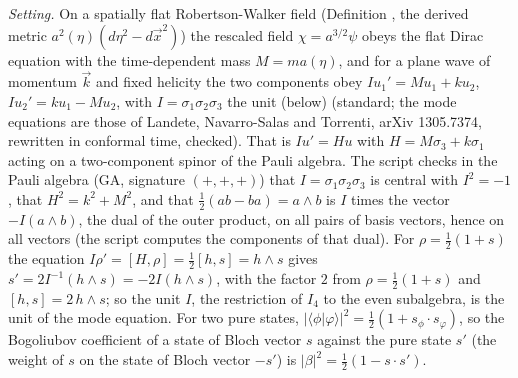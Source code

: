 \emph{Setting.} On a spatially flat Robertson-Walker field (Definition , the derived metric $a^{2}(\eta)(d\eta^{2} - d\vec x^{2})$) the rescaled field $\chi = a^{3/2}\psi$ obeys the flat Dirac equation with the time-dependent mass $M = ma(\eta)$, and for a plane wave of momentum $\vec k$ and fixed helicity the two components obey $Iu_{1}' = Mu_{1} + ku_{2}$, $Iu_{2}' = ku_{1} - Mu_{2}$, with $I = \sigma_{1}\sigma_{2}\sigma_{3}$ the unit (below) (standard; the mode equations are those of Landete, Navarro-Salas and Torrenti, arXiv 1305.7374, rewritten in conformal time, checked). That is $Iu' = Hu$ with $H = M\sigma_{3} + k\sigma_{1}$ acting on a two-component spinor of the Pauli algebra. The script checks in the Pauli algebra (GA, signature $(+,+,+)$) that $I = \sigma_{1}\sigma_{2}\sigma_{3}$ is central with $I^{2} = -1$, that $H^{2} = k^{2} + M^{2}$, and that $\tfrac12(ab - ba) = a\wedge b$ is $I$ times the vector $-I(a\wedge b)$, the dual of the outer product, on all pairs of basis vectors, hence on all vectors (the script computes the components of that dual). For $\rho = \tfrac12(1 + s)$ the equation $I\rho' = [H, \rho] = \tfrac12[h, s] = h\wedge s$ gives $s' = 2I^{-1}(h\wedge s) = -2I(h\wedge s)$, with the factor $2$ from $\rho = \tfrac12(1 + s)$ and $[h,s] = 2\,h\wedge s$; so the unit $I$, the restriction of $I_{4}$ to the even subalgebra, is the unit of the mode equation. For two pure states, $|\langle\phi|\varphi\rangle|^{2} = \tfrac12(1 + s_{\phi}\cdot s_{\varphi})$, so the Bogoliubov coefficient of a state of Bloch vector $s$ against the pure state $s'$ (the weight of $s$ on the state of Bloch vector $-s'$) is $|\beta|^{2} = \tfrac12(1 - s\cdot s')$.

